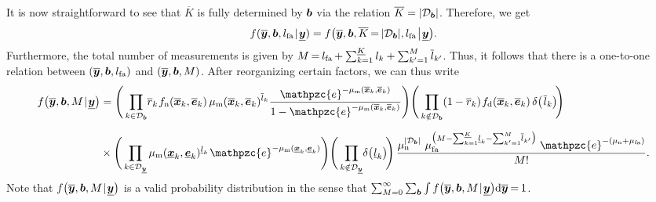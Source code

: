 \documentclass[11pt,a4paper]{article}
\newcommand{\ist}{\hspace*{.3mm}}
\newcommand{\rmv}{\hspace*{-.3mm}}
\newcommand{\cl}[1]{\mathcal{#1}}
\newcommand{\nn}{\nonumber}
\begin{document}
It is now straightforward to see that $\overline{K}$ is fully determined by $\bm{b}$ via the relation $\overline{K} = |\Set{D}_{\V{b}}|$. Therefore, we get
\begin{equation}
f(\overline{\V{y}}, \V{b}, l_{\mathrm{fa}} \ist | \ist \underline{\V{y}})  = f\big(\overline{\V{y}}, \V{b}, \overline{K} \rmv=\rmv |\Set{D}_{\V{b}}|, l_{\mathrm{fa}} \ist \big| \ist \underline{\V{y}}\big). \nn
\vspace{1mm}
\end{equation}
Furthermore, the total number of measurements is given by $M \rmv=\rmv l_{\mathrm{fa}} \rmv+ \sum^{\underline{K}}_{k=1} l_k + \sum^{M}_{k'=1} \overline{l}_{k'}$. Thus, it follows that there is a one-to-one relation between $(\overline{\bm{y}}, \bm{b}, l_{\mathrm{fa}} )$ and $(\overline{\bm{y}}, \bm{b}, M )$. After reorganizing certain factors, we can thus \vspace{0mm} write
\begin{align}
f\big(\overline{\V{y}}, \V{b}, M \ist | \ist \underline{\V{y}} \big) &= \Bigg( \prod_{k\in\Set{D}_{\V{b}}} \rmv\rmv \overline{r}_k \ist f_{\mathrm{n}}(\overline{\V{x}}_k, \overline{\V{e}}_k) \ist\ist \mu_{\mathrm{m}}(\overline{\V{x}}_k,\overline{\V{e}}_k)^{\overline{l}_k} \frac{\mathpzc{e}^{-\mu_{\mathrm{m}}(\overline{\V{x}}_k,\overline{\V{e}}_k) }}{1-\mathpzc{e}^{-\mu_{\mathrm{m}}(\overline{\V{x}}_k,\overline{\V{e}}_k) }}   \Bigg)  \Bigg(  \prod_{k \notin\Set{D}_{\V{b}}} (1 -\overline{r}_{k}) \ist f_{\mathrm{d}}(\overline{\V{x}}_{k}, \overline{\V{e}}_{k}) \ist\ist \delta\big(\ist \overline{l}_k \big) \rmv\rmv \Bigg)  \nn\\[2mm]
&\hspace{0mm} \times\Bigg( \prod_{k \in \cl{D}_{\underline{\V{y}}}} \mu_{\mathrm{m}} (\underline{\V{x}}_k,\underline{\V{e}}_k)^{\underline{l}_k} \ist \mathpzc{e}^{-\mu_{\mathrm{m}}(\underline{\V{x}}_k,\underline{\V{e}}_k)} \Bigg)  \Bigg( \prod_{k \notin \cl{D}_{\underline{\V{y}}}} \rmv\rmv  \delta \big( \hspace{.15mm} \underline{l}_k \big) \rmv\rmv \Bigg) \ist\ist \frac{ \mu^{|\Set{D}_{\V{b}}|}_{\mathrm{n}} \ist\ist\ist\ist \mu_{\mathrm{fa}}^{\big(M - \sum^{\underline{K}}_{k=1} \rmv\rmv \underline{l}_k - \sum^{M}_{k'=1} \rmv\rmv \overline{l}_{k'} \big)}\ist\ist\ist \mathpzc{e}^{-( \mu_{\mathrm{n}} + \mu_{\mathrm{fa}} )}}{M!}.  \nn \\[-3.5mm]
\label{eq:posterior2} \\[-8mm]
\nn
\end{align}
Note that  $f\big(\overline{\V{y}}, \V{b}, M \ist | \ist \underline{\V{y}} \big) $ is a valid probability distribution in the sense that $\sum^{\infty}_{M = 0} \sum_{\V{b}} \int f\big(\overline{\V{y}}, \V{b}, M \ist | \ist \underline{\V{y}} \big) \mathrm{d} \overline{\V{y}} \rmv=\rmv 1$.
\end{document}
